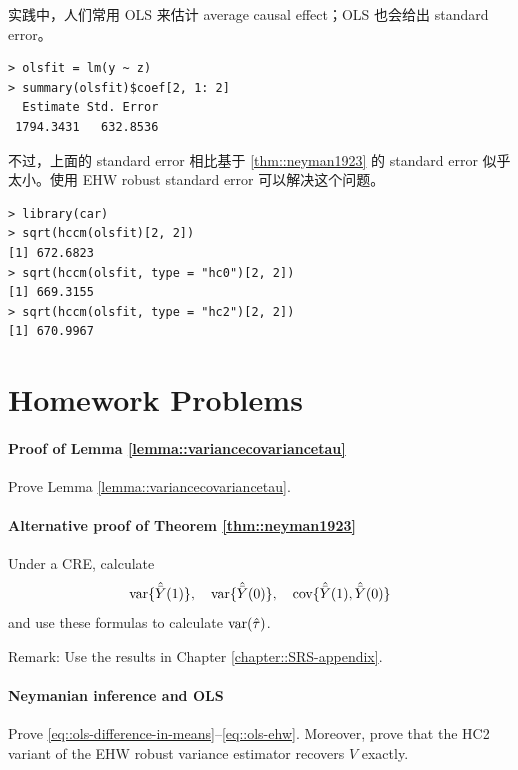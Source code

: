 实践中，人们常用 OLS 来估计 average causal effect；OLS 也会给出 standard error。
\begin{lstlisting}
> olsfit = lm(y ~ z)
> summary(olsfit)$coef[2, 1: 2]
  Estimate Std. Error
 1794.3431   632.8536
 \end{lstlisting}
不过，上面的 standard error 相比基于 \cref{thm::neyman1923} 的 standard error 似乎太小。使用 EHW robust standard error 可以解决这个问题。
\begin{lstlisting}
> library(car)
> sqrt(hccm(olsfit)[2, 2])
[1] 672.6823
> sqrt(hccm(olsfit, type = "hc0")[2, 2])
[1] 669.3155
> sqrt(hccm(olsfit, type = "hc2")[2, 2])
[1] 670.9967
 \end{lstlisting}





\section{Homework Problems}

\paragraph{Proof of Lemma \ref{lemma::variancecovariancetau}}\label{hw::proof-covariance-basic}


Prove Lemma \ref{lemma::variancecovariancetau}.


\paragraph{Alternative proof of Theorem \ref{thm::neyman1923}}\label{hw::neyman-alternative-proof}

Under a CRE, calculate
$$
\textup{var}\{  \hat{\bar{Y}}(1)  \} ,\quad
\textup{var}\{  \hat{\bar{Y}}(0)  \} ,\quad
\textup{cov}\{  \hat{\bar{Y}}(1) ,  \hat{\bar{Y}}(0)  \}
$$
and use these formulas to calculate $\textup{var}(\hat{\tau} )$.

Remark: Use the results in Chapter \ref{chapter::SRS-appendix}.





\paragraph{Neymanian inference and OLS}
\label{hw::neyman-ols-nox}


Prove \eqref{eq::ols-difference-in-means}--\eqref{eq::ols-ehw}. Moreover, prove that the HC2 variant of the EHW robust variance estimator recovers $\hat{V}$ exactly.

